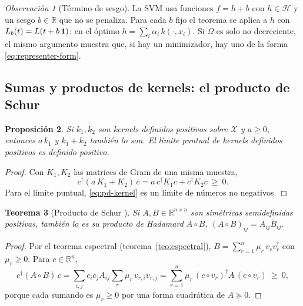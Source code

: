 \documentclass[11pt,a4paper]{article}
\newcommand{\R}{\mathbb{R}}
\newcommand{\X}{\mathcal{X}}
\newcommand{\Hk}{\mathcal{H}}
\newcommand{\dg}{\dagger}                         %
\theoremstyle{plain}
\newtheorem{teorema}{Teorema}[section]
\newtheorem{proposicion}[teorema]{Proposición}
\theoremstyle{definition}
\theoremstyle{remark}
\newtheorem{observacion}[teorema]{Observación}
\numberwithin{equation}{section}
\begin{document}
\begin{observacion}[Término de sesgo]\label{obs:sesgo}
La SVM usa funciones $f=h+b$ con $h\in\Hk$ y un sesgo $b\in\R$ que no se penaliza. Para cada
$b$ fijo el teorema se aplica a $h$ con $L_b(t)=L(t+b\,\mathbf{1})$: en el óptimo
$h=\sum_i\alpha_i\,k(\cdot,x_i)$. Si $\Omega$ es solo no decreciente, el mismo argumento
muestra que, si hay un minimizador, hay uno de la forma \eqref{eq:representer-form}.
\end{observacion}

\subsection{Sumas y productos de kernels: el producto de Schur}\label{sec:schur}

\begin{proposicion}\label{prop:suma}
Si $k_1,k_2$ son kernels definidos positivos sobre $\X$ y $a\ge0$, entonces $a\,k_1$ y
$k_1+k_2$ también lo son. El límite puntual de kernels definidos positivos es definido
positivo.
\end{proposicion}
\begin{proof}
Con $K_1,K_2$ las matrices de Gram de una misma muestra,
\begin{equation}\label{eq:sum-kernel}
  c^{\dg}(a\,K_1+K_2)\,c=a\,c^{\dg}K_1c+c^{\dg}K_2c\ \ge\ 0 .
\end{equation}
Para el límite puntual, \eqref{eq:pd-kernel} es un límite de números no negativos.
\end{proof}

\begin{teorema}[Producto de Schur \cite{schur1911}]\label{teo:schur}
Si $A,B\in\R^{n\times n}$ son simétricas semidefinidas positivas, también lo es su producto
de Hadamard $A\circ B$, $(A\circ B)_{ij}=A_{ij}B_{ij}$.
\end{teorema}
\begin{proof}
Por el teorema espectral (teorema~\ref{teo:espectral}),
$B=\sum_{r=1}^n\mu_r\,v_rv_r^{\dg}$ con $\mu_r\ge0$. Para $c\in\R^n$,
\begin{equation}\label{eq:schur}
  c^{\dg}(A\circ B)\,c=\sum_{i,j}c_ic_jA_{ij}\sum_{r}\mu_r\,v_{r,i}v_{r,j}
  =\sum_{r=1}^n\mu_r\,(c\circ v_r)^{\dg}A\,(c\circ v_r)\ \ge\ 0,
\end{equation}
porque cada sumando es $\mu_r\ge0$ por una forma cuadrática de $A\succeq0$.
\end{proof}
\end{document}

